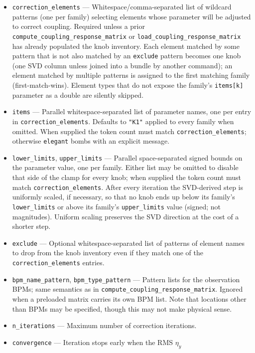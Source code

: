\documentclass[11pt]{article}
\begin{document}
\begin{itemize}
\item \verb|correction_elements| --- Whitespace/comma-separated list of
  wildcard patterns (one per family) selecting elements whose parameter will
  be adjusted to correct coupling.  Required unless a prior
  \verb|compute_coupling_response_matrix| or \verb|load_coupling_response_matrix|
  has already populated the knob inventory.  Each element matched by some
  pattern that is not also matched by an \verb|exclude| pattern becomes one
  knob (one SVD column unless joined into a bundle by another command);
  an element matched by multiple patterns is assigned to the first matching
  family (first-match-wins).  Element types that do not expose the family's
  \verb|items[k]| parameter as a double are silently skipped.
\item \verb|items| --- Parallel whitespace-separated list of parameter names,
  one per entry in \verb|correction_elements|.  Defaults to \verb|"K1"|
  applied to every family when omitted.  When supplied the token count must
  match \verb|correction_elements|; otherwise \verb|elegant| bombs with an
  explicit message.
\item \verb|lower_limits|, \verb|upper_limits| --- Parallel space-separated
  signed bounds on the parameter value, one per family.  Either list may be
  omitted to disable that side of the clamp for every knob; when supplied
  the token count must match \verb|correction_elements|.  After every
  iteration the SVD-derived step is uniformly scaled, if necessary, so that
  no knob ends up below its family's \verb|lower_limits| or above its family's
  \verb|upper_limits| value (signed; not magnitudes).  Uniform scaling
  preserves the SVD direction at the cost of a shorter step.
\item \verb|exclude| --- Optional whitespace-separated list of patterns of
  element names to drop from the knob inventory even if they match one of
  the \verb|correction_elements| entries.
\item \verb|bpm_name_pattern|, \verb|bpm_type_pattern| --- Pattern lists for
  the observation BPMs; same semantics as in
  \verb|compute_coupling_response_matrix|.  Ignored when a preloaded matrix
  carries its own BPM list. Note that locations other than BPMs may be specified,
  though this may not make physical sense.
\item \verb|n_iterations| --- Maximum number of correction iterations.
\item \verb|convergence| --- Iteration stops early when the RMS $\eta_y$

\end{itemize}
\end{document}
